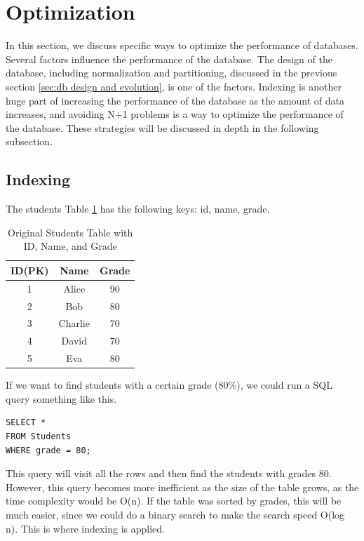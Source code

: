 \section[Optimization]{Optimization}
\label{sec:dbOptimization}


In this section, we discuss specific ways to optimize the performance of databases.
Several factors influence the performance of the database.
The design of the database, including normalization and partitioning, discussed in the previous section \ref{sec:db design and evolution}, is one of the factors.
Indexing is another huge part of increasing the performance of the database as the amount of data increases,
and avoiding N+1 problems is a way to optimize the performance of the database. These strategies will be discussed in depth in the following subsection.


\subsection{Indexing}

The students Table \ref{tab:students_original} has the following keys: id, name, grade.
\begin{table}[H]
\centering
\begin{tabular}{|c|c|c|}
\hline
\textbf{ID(PK)} & \textbf{Name} & \textbf{Grade} \\ \hline
1 & Alice   & 90 \\ \hline
2 & Bob     & 80 \\ \hline
3 & Charlie & 70 \\ \hline
4 & David   & 70 \\ \hline
5 & Eva     & 80 \\ \hline
\end{tabular}
\caption{Original Students Table with ID, Name, and Grade}
\label{tab:students_original}
\end{table}

If we want to find students with a certain grade (80\%),
we could run a SQL query something like this.
\begin{verbatim}
SELECT * 
FROM Students
WHERE grade = 80;
\end{verbatim}

This query will visit all the rows and then find the students with grades 80. However, this query becomes more inefficient as the size of the table grows,
as the time complexity would be O(n). If the table was sorted by grades, this will be much easier, since we could do a binary search to make the search speed O(log n).
This is where indexing is applied. 

